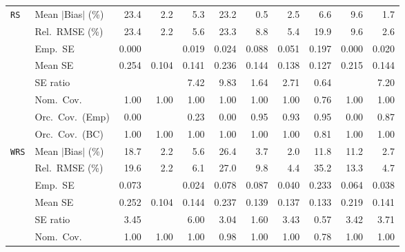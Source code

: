 \begin{landscape}
\begin{longtable}{llrrrrrrrrr}
\addlinespace[2pt]
\quad \texttt{RS} & Mean $|$Bias$|$ (\%) & 23.4 & \cellcolor{rankthree}2.2 & 5.3 & 23.2 & \cellcolor{rankone}0.5 & 2.5 & 6.6 & 9.6 & \cellcolor{ranktwo}1.7 \\
 & Rel.\ RMSE (\%) & 23.4 & \cellcolor{rankone}2.2 & 5.6 & 23.3 & 8.8 & \cellcolor{rankthree}5.4 & 19.9 & 9.6 & \cellcolor{ranktwo}2.6 \\
 & Emp.\ SE & 0.000 &  & 0.019 & 0.024 & 0.088 & 0.051 & 0.197 & 0.000 & 0.020 \\
 & Mean SE & 0.254 & 0.104 & 0.141 & 0.236 & 0.144 & 0.138 & 0.127 & 0.215 & 0.144 \\
 & SE ratio &  &  & 7.42 & 9.83 & \cellcolor{ranktwo}1.64 & \cellcolor{rankthree}2.71 & \cellcolor{rankone}0.64 &  & 7.20 \\
 & Nom.\ Cov. & \cellcolor{rankone}1.00 & \cellcolor{rankone}1.00 & \cellcolor{rankone}1.00 & \cellcolor{rankone}1.00 & \cellcolor{rankone}1.00 & \cellcolor{rankone}1.00 & \cellcolor{ranktwo}0.76 & \cellcolor{rankone}1.00 & \cellcolor{rankone}1.00 \\
 & Orc.\ Cov.\ (Emp) & 0.00 &  & 0.23 & 0.00 & \cellcolor{rankone}0.95 & \cellcolor{ranktwo}0.93 & \cellcolor{rankone}0.95 & 0.00 & \cellcolor{rankthree}0.87 \\
 & Orc.\ Cov.\ (BC) & \cellcolor{rankone}1.00 & \cellcolor{rankone}1.00 & \cellcolor{rankone}1.00 & \cellcolor{rankone}1.00 & \cellcolor{rankone}1.00 & \cellcolor{rankone}1.00 & \cellcolor{ranktwo}0.81 & \cellcolor{rankone}1.00 & \cellcolor{rankone}1.00 \\
\addlinespace[2pt]
\quad \texttt{WRS} & Mean $|$Bias$|$ (\%) & 18.7 & \cellcolor{ranktwo}2.2 & 5.6 & 26.4 & 3.7 & \cellcolor{rankone}2.0 & 11.8 & 11.2 & \cellcolor{rankthree}2.7 \\
 & Rel.\ RMSE (\%) & 19.6 & \cellcolor{rankone}2.2 & 6.1 & 27.0 & 9.8 & \cellcolor{ranktwo}4.4 & 35.2 & 13.3 & \cellcolor{rankthree}4.7 \\
 & Emp.\ SE & 0.073 &  & 0.024 & 0.078 & 0.087 & 0.040 & 0.233 & 0.064 & 0.038 \\
 & Mean SE & 0.252 & 0.104 & 0.144 & 0.237 & 0.139 & 0.137 & 0.133 & 0.219 & 0.141 \\
 & SE ratio & 3.45 &  & 6.00 & \cellcolor{rankthree}3.04 & \cellcolor{ranktwo}1.60 & 3.43 & \cellcolor{rankone}0.57 & 3.42 & 3.71 \\
 & Nom.\ Cov. & \cellcolor{ranktwo}1.00 & \cellcolor{ranktwo}1.00 & \cellcolor{ranktwo}1.00 & \cellcolor{rankone}0.98 & \cellcolor{ranktwo}1.00 & \cellcolor{ranktwo}1.00 & \cellcolor{rankthree}0.78 & \cellcolor{ranktwo}1.00 & \cellcolor{ranktwo}1.00 \\

\end{longtable}
\end{landscape}
